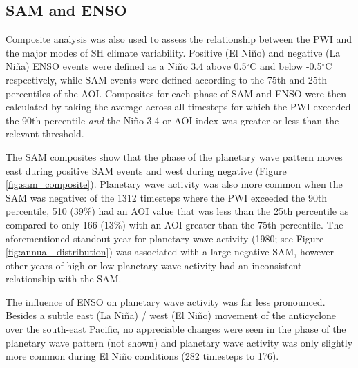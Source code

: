 \subsection{SAM and ENSO}

Composite analysis was also used to assess the relationship between the PWI and the major modes of SH climate variability. Positive (El Ni\~{n}o) and negative (La Ni\~{n}a) ENSO events were defined as a Ni\~{n}o 3.4 above 0.5$^{\circ}$C and below -0.5$^{\circ}$C respectively, while SAM events were defined according to the 75th and 25th percentiles of the AOI. Composites for each phase of SAM and ENSO were then calculated by taking the average across all timesteps for which the PWI exceeded the 90th percentile \textit{and} the Ni\~{n}o 3.4 or AOI index was greater or less than the relevant threshold. 

The SAM composites show that the phase of the planetary wave pattern moves east during positive SAM events and west during negative (Figure \ref{fig:sam_composite}). Planetary wave activity was also more common when the SAM was negative: of the 1312 timesteps where the PWI exceeded the 90th percentile, 510 (39\%) had an AOI value that was less than the 25th percentile as compared to only 166 (13\%) with an AOI greater than the 75th percentile. The aforementioned standout year for planetary wave activity (1980; see Figure \ref{fig:annual_distribution}) was associated with a large negative SAM, however other years of high or low planetary wave activity had an inconsistent relationship with the SAM.

The influence of ENSO on planetary wave activity was far less pronounced. Besides a subtle east (La Ni\~{n}a) / west (El Ni\~{n}o) movement of the anticyclone over the south-east Pacific, no appreciable changes were seen in the phase of the planetary wave pattern (not shown) and planetary wave activity was only slightly more common during El Ni\~{n}o conditions (282 timesteps to 176).      